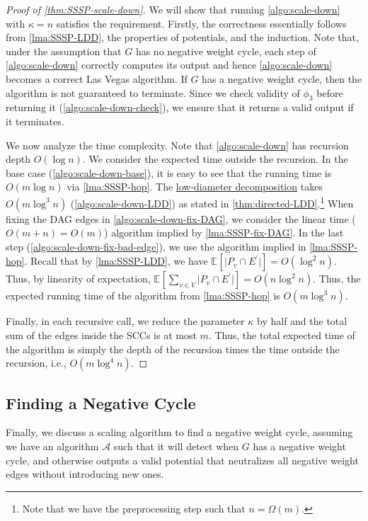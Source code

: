 \begin{proof}[Proof of \autoref{thm:SSSP-scale-down}]
	We will show that running \autoref{algo:scale-down} with \(\kappa = n\) satisfies the requirement. Firstly, the correctness essentially follows from \autoref{lma:SSSP-LDD}, the properties of potentials, and the induction. Note that, under the assumption that \(G\) has no negative weight cycle, each step of \autoref{algo:scale-down} correctly computes its output and hence \autoref{algo:scale-down} becomes a correct Las Vegas algorithm. If \(G\) has a negative weight cycle, then the algorithm is not guaranteed to terminate. Since we check validity of \(\phi _3 \) before returning it (\autoref{algo:scale-down-check}), we ensure that it returns a valid output if it terminates.

	We now analyze the time complexity. Note that \autoref{algo:scale-down} has recursion depth \(O(\log n)\). We consider the expected time outside the recursion. In the base case (\autoref{algo:scale-down-base}), it is easy to see that the running time is \(O(m \log n)\) via \autoref{lma:SSSP-hop}. The \hyperref[thm:directed-LDD]{low-diameter decomposition} takes \(O(m \log ^3 n)\) (\autoref{algo:scale-down-LDD}) as stated in \autoref{thm:directed-LDD}.\footnote{Note that we have the preprocessing step such that \(n = \Omega (m)\).} When fixing the DAG edges in \autoref{algo:scale-down-fix-DAG}, we consider the linear time (\(O(m + n) = O(m)\)) algorithm implied by \autoref{lma:SSSP-fix-DAG}. In the last step (\autoref{algo:scale-down-fix-bad-edge}), we use the algorithm implied in \autoref{lma:SSSP-hop}. Recall that by \autoref{lma:SSSP-LDD}, we have \(\mathbb{E}_{}[\lvert P_v \cap E^{\prime} \rvert ] = O(\log ^2 n)\). Thus, by linearity of expectation, \(\mathbb{E}_{}[\sum_{v \in V} \lvert P_v \cap E^{\prime} \rvert ] = O(n \log ^2 n)\). Thus, the expected running time of the algorithm from \autoref{lma:SSSP-hop} is \(O(m \log ^3 n)\).

	Finally, in each recursive call, we reduce the parameter \(\kappa \) by half and the total sum of the edges inside the SCCs is at most \(m\). Thus, the total expected time of the algorithm is simply the depth of the recursion times the time outside the recursion, i.e., \(O(m \log ^4 n)\).
\end{proof}

\subsection{Finding a Negative Cycle}
Finally, we discuss a scaling algorithm to find a negative weight cycle, assuming we have an algorithm \(\mathcal{A} \) such that it will detect when \(G\) has a negative weight cycle, and otherwise outputs a valid potential that neutralizes all negative weight edges without introducing new ones.

